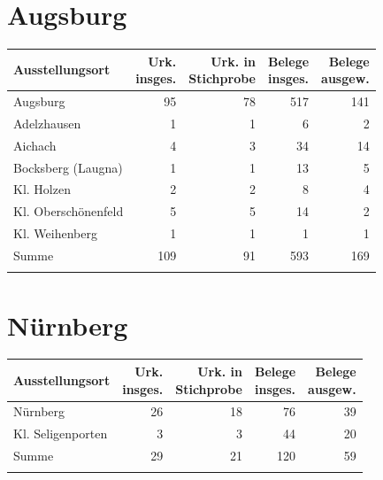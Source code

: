 \section{Augsburg}

\begin{tabularx}{\linewidth}{X r r r r}
\lsptoprule
Ausstellungsort
	& \makecell{Urk.\\ insges.}
	& \makecell{Urk. in\\ Stichprobe}
	& \makecell{Belege\\ insges.}
	& \makecell{Belege\\ ausgew.}
	\\
\midrule

Augsburg
	& 95
	& 78
	& 517
	& 141
	\\

Adelzhausen
	& 1
	& 1
	& 6
	& 2
	\\

Aichach
	& 4
	& 3
	& 34
	& 14
	\\

Bocksberg (Laugna)
	& 1
	& 1
	& 13
	& 5
	\\

Kl. Holzen
	& 2
	& 2
	& 8
	& 4
	\\

Kl. Oberschönenfeld
	& 5
	& 5
	& 14
	& 2
	\\

Kl. Weihenberg
	& 1
	& 1
	& 1
	& 1
	\\

\midrule

Summe
	& 109
	& 91
	& 593
	& 169
	\\

\lspbottomrule
\end{tabularx}

\section{Nürnberg}

\begin{tabularx}{\linewidth}{X r r r r}
\lsptoprule
Ausstellungsort
	& \makecell{Urk.\\ insges.}
	& \makecell{Urk. in\\ Stichprobe}
	& \makecell{Belege\\ insges.}
	& \makecell{Belege\\ ausgew.}
	\\
\midrule

Nürnberg
	& 26
	& 18
	& 76
	& 39
	\\

Kl. Seligenporten
	& 3
	& 3
	& 44
	& 20
	\\

\midrule

Summe
	& 29
	& 21
	& 120
	& 59
	\\

\lspbottomrule
\end{tabularx}

